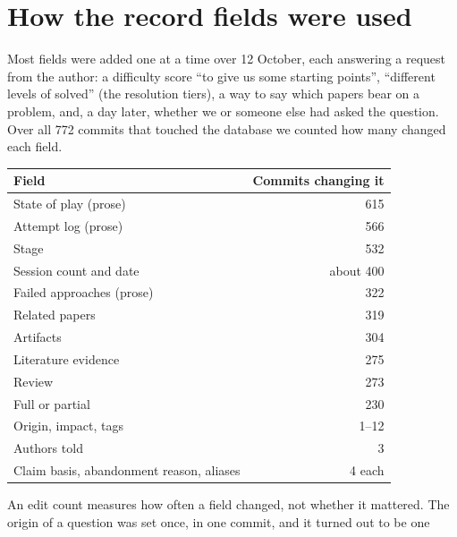 \documentclass[11pt]{amsart}
\begin{document}
\section{How the record fields were used}\label{app:fields}
Most fields were added one at a time over 12 October, each answering a request
from the author: a difficulty score ``to give us some starting points'',
``different levels of solved'' (the resolution tiers), a way to say which
papers bear on a problem, and, a day later, whether we or someone else had
asked the question. Over all 772 commits that touched the database we counted
how many changed each field.
\begin{center}
  \begin{tabular}{lr}
    \toprule
    Field                                    & Commits changing it \\
    \midrule
    State of play (prose)                    & 615                 \\
    Attempt log (prose)                      & 566                 \\
    Stage                                    & 532                 \\
    Session count and date                   & about 400           \\
    Failed approaches (prose)                & 322                 \\
    Related papers                           & 319                 \\
    Artifacts                                & 304                 \\
    Literature evidence                      & 275                 \\
    Review                                   & 273                 \\
    Full or partial                          & 230                 \\
    \midrule
    Origin, impact, tags                     & 1--12               \\
    Authors told                             & 3                   \\
    Claim basis, abandonment reason, aliases & 4 each              \\
    \bottomrule
  \end{tabular}
\end{center}
An edit count measures how often a field changed, not whether it mattered. The
origin of a question was set once, in one commit, and it turned out to be one
\end{document}
